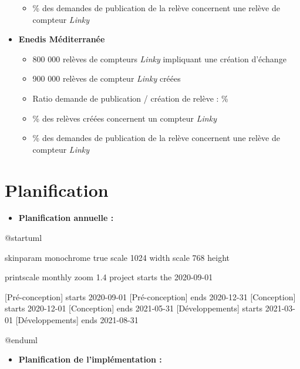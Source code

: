 \documentclass[a4paper, 12pt]{report}
\begin{document}
\begin{itemize}
\begin{itemize}
    \item \approx{}\% des demandes de publication de la relève concernent une relève de compteur \textit{Linky}
  \end{itemize}
  \item \textbf{Enedis Méditerranée}
  \begin{itemize}
    \item \approx{} 800 000 relèves de compteurs \textit{Linky} impliquant une création d'échange
    \item \approx{} 900 000 relèves de compteur \textit{Linky} créées
    \item Ratio demande de publication / création de relève : \approx{}\%
    \item \approx{}\% des relèves créées concernent un compteur \textit{Linky}
    \item \approx{}\% des demandes de publication de la relève concernent une relève de compteur \textit{Linky}
  \end{itemize}
\end{itemize}

\chapter{Planification}
\label{appendix:planification}

\begin{itemize}
  \item \textbf{Planification annuelle :}\\
\end{itemize}

\begin{center}
  \begin{plantuml}
    @startuml

    skinparam monochrome true
    scale 1024 width
    scale 768 height

    printscale monthly zoom 1.4
    project starts the 2020-09-01

    [Pré-conception] starts 2020-09-01
    [Pré-conception] ends 2020-12-31
    [Conception] starts 2020-12-01
    [Conception] ends 2021-05-31
    [Développements] starts 2021-03-01
    [Développements] ends 2021-08-31

    @enduml
  \end{plantuml}
\end{center}
\vspace{1cm}

\begin{itemize}
  \item \textbf{Planification de l'implémentation :}\\
\end{itemize}
\end{document}
